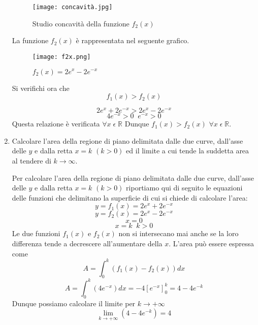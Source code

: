 \documentclass[a4paper,12pt]{article}
\begin{document}
\begin{enumerate}
\begin{figure}[H]
\centering
\texttt{[image: concavità.jpg]}
\caption {Studio concavità della funzione $f_2(x)$}
\end{figure}

La funzione $f_2(x)$ è rappresentata nel seguente grafico.
\begin{figure}[H]
\centering
\texttt{[image: f2x.png]}
\caption {$f_2(x)=2e^x-2e^{-x}$}
\end{figure}

Si verifichi ora che 
\begin{equation}f_1(x)>f_2(x)\end{equation}

\begin{equation}2e^x+2e^{-x}>2e^x-2e^{-x}\end{equation}
\begin{equation}4e^{-x}>0\;\;e^{-x}>0\end{equation}
Questa relazione è verificata  $\forall x\; \epsilon\; \mathbb{R}$
Dunque $f_1(x) > f_2(x)$  $\forall x\; \epsilon\; \mathbb{R}$.

\item  Calcolare l’area della regione di piano delimitata dalle due curve, dall’asse delle $y$ e dalla retta $x = k$ $(k>0)$ ed il limite a cui tende la suddetta area al tendere di $k \rightarrow \infty$.

Per calcolare l'area della regione di piano delimitata dalle due curve, dall’asse delle $y$ e dalla retta $x = k$ $(k>0)$ riportiamo qui di seguito le equazioni delle funzioni che delimitano la superficie di cui si chiede di calcolare l'area:
\begin{equation}y=f_1(x)=2e^x+2e^{-x}\end{equation}
\begin{equation}y=f_2(x)=2e^x-2e^{-x}\end{equation}
\begin{equation}x=0\end{equation}
\begin{equation}x=k\;\; k>0\end{equation}
Le due funzioni $f_1(x)$ e $f_2(x)$ non si intersecano mai anche se la loro differenza tende a decrescere all'aumentare della $x$.
L'area può essere espressa come 
\begin{equation}A=\int_{0}^k (f_1(x)-f_2(x))dx\end{equation}
\begin{equation}A=\int_{0}^k (4e^{-x})dx=-4[e^{-x}]_{0}^k = 4-4e^{-k}\end{equation}
Dunque possiamo calcolare il limite per $k\rightarrow +\infty$
\begin{equation} \lim_{k\rightarrow +\infty} (4-4e^{-k})=4\end{equation}


\end{enumerate}
\end{document}
